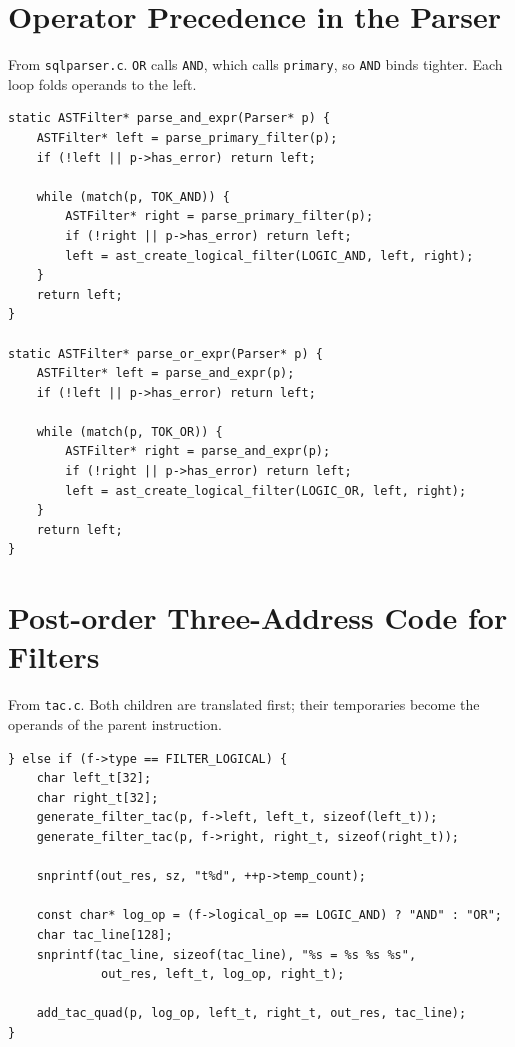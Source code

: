 \documentclass[12pt,a4paper]{report}
\newcommand{\codeus}{\textunderscore\allowbreak}
\DeclareRobustCommand{\code}[1]{\texttt{\let\_\codeus #1}}
\begin{document}
\section{Operator Precedence in the Parser}
From \code{sql\_parser.c}. \code{OR} calls \code{AND}, which calls \code{primary}, so \code{AND} binds tighter. Each loop folds operands to the left.
\begin{lstlisting}
static ASTFilter* parse_and_expr(Parser* p) {
    ASTFilter* left = parse_primary_filter(p);
    if (!left || p->has_error) return left;

    while (match(p, TOK_AND)) {
        ASTFilter* right = parse_primary_filter(p);
        if (!right || p->has_error) return left;
        left = ast_create_logical_filter(LOGIC_AND, left, right);
    }
    return left;
}

static ASTFilter* parse_or_expr(Parser* p) {
    ASTFilter* left = parse_and_expr(p);
    if (!left || p->has_error) return left;

    while (match(p, TOK_OR)) {
        ASTFilter* right = parse_and_expr(p);
        if (!right || p->has_error) return left;
        left = ast_create_logical_filter(LOGIC_OR, left, right);
    }
    return left;
}
\end{lstlisting}

\section{Post-order Three-Address Code for Filters}
From \code{tac.c}. Both children are translated first; their temporaries become the operands of the parent instruction.
\begin{lstlisting}
} else if (f->type == FILTER_LOGICAL) {
    char left_t[32];
    char right_t[32];
    generate_filter_tac(p, f->left, left_t, sizeof(left_t));
    generate_filter_tac(p, f->right, right_t, sizeof(right_t));

    snprintf(out_res, sz, "t%d", ++p->temp_count);

    const char* log_op = (f->logical_op == LOGIC_AND) ? "AND" : "OR";
    char tac_line[128];
    snprintf(tac_line, sizeof(tac_line), "%s = %s %s %s",
             out_res, left_t, log_op, right_t);

    add_tac_quad(p, log_op, left_t, right_t, out_res, tac_line);
}
\end{lstlisting}
\end{document}
